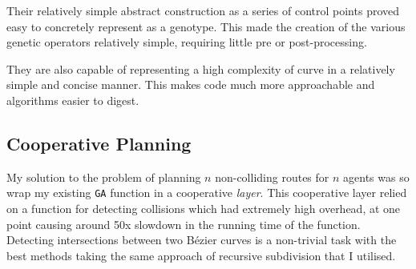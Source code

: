 Their relatively simple abstract construction as a series of control points proved easy to concretely represent as a genotype. This made the creation of the various genetic operators relatively simple, requiring little pre or post-processing.

They are also capable of representing a high complexity of curve in a relatively simple and concise manner. This makes code much more approachable and algorithms easier to digest.

\subsection{Cooperative Planning}
\label{subsec:eval-cooperativeplanning}

My solution to the problem of planning $n$ non-colliding routes for $n$ agents was so wrap my existing \texttt{GA} function in a cooperative \textit{layer}. This cooperative layer relied on a function for detecting collisions which had extremely high overhead, at one point causing around 50x slowdown in the running time of the function. Detecting intersections between two Bézier curves is a non-trivial task with the best methods taking the same approach of recursive subdivision that I utilised.





